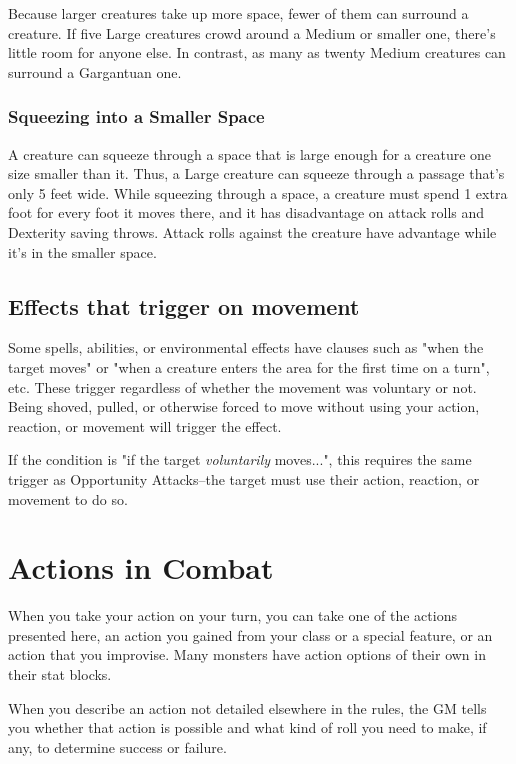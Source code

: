Because larger creatures take up more space, fewer of them can surround a creature. If five Large creatures crowd around a Medium or smaller one, there's little room for anyone else. In contrast, as many as twenty Medium creatures can surround a Gargantuan one.

\subsubsection{Squeezing into a Smaller Space}

A creature can squeeze through a space that is large enough for a creature one size smaller than it. Thus, a Large creature can squeeze through a passage that's only 5 feet wide. While squeezing through a space, a creature must spend 1 extra foot for every foot it moves there, and it has disadvantage on attack rolls and Dexterity saving throws. Attack rolls against the creature have advantage while it's in the smaller space.

\subsection{Effects that trigger on movement}
Some spells, abilities, or environmental effects have clauses such as "when the target moves" or "when a creature enters the area for the first time on a turn", etc. These trigger regardless of whether the movement was voluntary or not. Being shoved, pulled, or otherwise forced to move without using your action, reaction, or movement will trigger the effect.

If the condition is "if the target \textit{voluntarily} moves...", this requires the same trigger as Opportunity Attacks--the target must use their action, reaction, or movement to do so.

\section{Actions in Combat}\label{sec:actions-in-combat}

When you take your action on your turn, you can take one of the actions presented here, an action you gained from your class or a special feature, or an action that you improvise. Many monsters have action options of their own in their stat blocks.

When you describe an action not detailed elsewhere in the rules, the GM tells you whether that action is possible and what kind of roll you need to make, if any, to determine success or failure.

